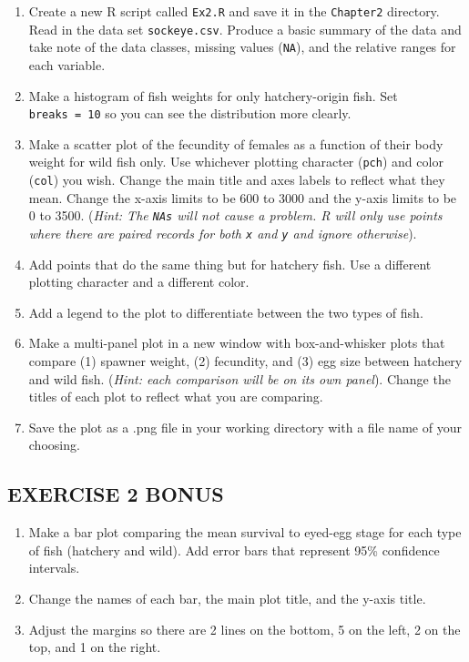 \documentclass[]{book}
\providecommand{\tightlist}{%
  \setlength{\itemsep}{0pt}\setlength{\parskip}{0pt}}
\theoremstyle{definition}
\theoremstyle{definition}
\theoremstyle{definition}
\theoremstyle{remark}
\begin{document}
\begin{enumerate}
\def\labelenumi{\arabic{enumi}.}
\tightlist
\item
  Create a new R script called \texttt{Ex2.R} and save it in the
  \texttt{Chapter2} directory. Read in the data set
  \texttt{sockeye.csv}. Produce a basic summary of the data and take
  note of the data classes, missing values (\texttt{NA}), and the
  relative ranges for each variable.
\item
  Make a histogram of fish weights for only hatchery-origin fish. Set
  \texttt{breaks\ =\ 10} so you can see the distribution more clearly.
\item
  Make a scatter plot of the fecundity of females as a function of their
  body weight for wild fish only. Use whichever plotting character
  (\texttt{pch}) and color (\texttt{col}) you wish. Change the main
  title and axes labels to reflect what they mean. Change the x-axis
  limits to be 600 to 3000 and the y-axis limits to be 0 to 3500.
  (\emph{Hint: The \texttt{NAs} will not cause a problem. R will only
  use points where there are paired records for both \texttt{x} and
  \texttt{y} and ignore otherwise}).
\item
  Add points that do the same thing but for hatchery fish. Use a
  different plotting character and a different color.
\item
  Add a legend to the plot to differentiate between the two types of
  fish.\\
\item
  Make a multi-panel plot in a new window with box-and-whisker plots
  that compare (1) spawner weight, (2) fecundity, and (3) egg size
  between hatchery and wild fish. (\emph{Hint: each comparison will be
  on its own panel}). Change the titles of each plot to reflect what you
  are comparing.
\item
  Save the plot as a .png file in your working directory with a file
  name of your choosing.
\end{enumerate}

\subsection*{EXERCISE 2 BONUS}\label{exercise-2-bonus}

\begin{enumerate}
\def\labelenumi{\arabic{enumi}.}
\tightlist
\item
  Make a bar plot comparing the mean survival to eyed-egg stage for each
  type of fish (hatchery and wild). Add error bars that represent 95\%
  confidence intervals.
\item
  Change the names of each bar, the main plot title, and the y-axis
  title.\\
\item
  Adjust the margins so there are 2 lines on the bottom, 5 on the left,
  2 on the top, and 1 on the right.
\end{enumerate}
\end{document}
